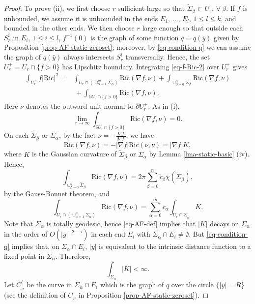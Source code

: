 \documentclass[12pt]{amsart}
\theoremstyle{remark}
\numberwithin{equation}{section}
\newcommand{\Ric}{\mbox{Ric}}
\newcommand{\be}{\begin{equation}}
\newcommand{\ee}{\end{equation}}
\def\p{\partial}
\def\lf{\left}
\def\ri{\right}
\def\a{\alpha}
\begin{document}
\begin{proof}
To prove (ii),  we first choose $r$ sufficient large so that $\tilde \Sigma_\beta \subset U_r$, $ \forall \ \beta$.
If $f$ is unbounded, we assume it is unbounded in the ends $E_1$, $\ldots$, $E_l$, $ 1 \le l \le k $,  and    bounded in the other ends.
We then choose $r$ large enough so that outside each $S_r^i$ in $E_i$, $1 \le i \le l $, $f^{-1}(0)$ is  the graph of some function
$q = q(\bar{y})$ given by Proposition \ref{prop-AF-static-zeroset}; moreover, by \eqref{eq-condition-q} we can assume
the graph of $q( \bar{y})$ always intersects  $ S_r^i $ transversally.
Hence,  the set $U_r^+=U_r\cap \{f>0\}$ has Lipschitz boundary.
Integrating  \eqref{eq-f-Ric-2} over $U_r^+$  gives
\be\label{eq-unbounded-1}
\begin{split}
\int_{U_r^+} f | \Ric|^2 = & \int_{U_r \cap \lf(\cup_{\a=1}^m \Sigma_\a \ri)} \Ric (\nabla f, \nu) + \int_{\cup_{\beta = 0}^n \tilde  \Sigma_\beta }\Ric (\nabla f, \nu) \\
& \ +\int_{\p U_r   \cap \{f>0\}}\Ric (\nabla f, \nu) .
\end{split}
\ee
Here $ \nu$ denotes the outward unit normal to $\p U_r^+$.
As in (i),
\be\label{eq-unbounded-11}
 \lim_{r \rightarrow \infty} \int_{\p U_r  \cap \{f>0\}}\Ric (\nabla f, \nu)=0.
 \ee
 On each $\tilde \Sigma_\beta$ or $\Sigma_\a$,  by the fact $\nu= - \frac{ \nabla f}{|\nabla f|}$, we have
$$
\Ric (\nabla f, \nu) = - | \nabla f | \Ric (\nu, \nu)  = |\nabla f| K,
$$
where $K$ is the Gaussian curvature of $\tilde \Sigma_\beta$ or $\Sigma_\a$ by Lemma \ref{lma-static-basic} (iv).
Hence,
\be \label{eq-bounded-int}
\int_{ \cup_{\beta = 0}^n  \tilde  \Sigma_\beta}  \Ric (\nabla f, \nu )
 = 2 \pi \sum_{\beta = 0}^n  \tilde c_\beta \chi(\tilde \Sigma_\beta),
\ee
by the Gauss-Bonnet theorem,
and
\be \label{eq-unbounded-int}
\int_{ U_r \cap \lf(\cup_{\a=1}^m \Sigma_\a \ri) }
 \Ric (\nabla f, \nu )
=   \sum_{ \a = 0 }^m   {c}_\a \int_{{ U_r \cap \Sigma}_\a } K .
\ee
Note that  $\Sigma_\a$ is totally geodesic, hence \eqref{eq-AF-def} implies that $|K|$ decays on $\Sigma_\alpha$
in the order of $O(| y|^{-2 - \tau} )$ in  each  end $E_i $ with $ \Sigma_\a \cap E_i \neq \emptyset$.
But \eqref{eq-condition-q} implies that, on $ \Sigma_\a \cap E_i $,  $ |y|$ is equivalent to the intrinsic distance function to a fixed point in $\Sigma_\a$.
Therefore,
\be \label{eq-finite-K}
 \int_{\Sigma_\a} | K | < \infty .
 \ee
Let $ C_{_R}^i$ be the curve in $\Sigma_\a \cap E_i$ which is the graph of $q$ over
 the circle $\{ | \bar{y} | = R \}$ (see the definition of $C_{_R}$ in Proposition \ref{prop-AF-static-zeroset}).

\end{proof}
\end{document}
